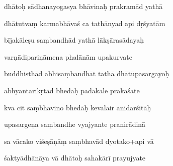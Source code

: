 \documentclass[article,12pt,a4paper]{memoir}%
\newcounter{parCount}
\begin{document}
	  
	  \pstart {} dhātoḥ sādhanayogasya bhāvinaḥ prakramād yathā 
	{}
	\pend%
      

	  
	  \pstart \leavevmode%
	dhātutvaṃ karmabhāvaś ca tathānyad api dṛśyatām 
	{}
	\pend%
      

	  
	  \pstart {} bījakāleṣu saṃbandhād yathā lākṣārasādayaḥ 
	{}
	\pend%
      

	  
	  \pstart \leavevmode%
	varṇādipariṇāmena phalānām upakurvate 
	{}
	\pend%
      

	  
	  \pstart {} buddhisthād abhisaṃbandhāt tathā dhātūpasargayoḥ 
	{}
	\pend%
      

	  
	  \pstart \leavevmode%
	abhyantarīkṛtād bhedaḥ padakāle prakāśate 
	{}
	\pend%
      

	  
	  \pstart {} kva cit saṃbhavino bhedāḥ kevalair anidarśitāḥ 
	{}
	\pend%
      

	  
	  \pstart \leavevmode%
	upasargeṇa saṃbandhe vyajyante pranirādinā 
	{}
	\pend%
      

	  
	  \pstart {} sa vācako viśeṣāṇāṃ saṃbhavād dyotako+api vā 
	{}
	\pend%
      

	  
	  \pstart \leavevmode%
	śaktyādhānāya vā dhātoḥ sahakārī prayujyate 
	{}
	\pend%
      
\end{document}
